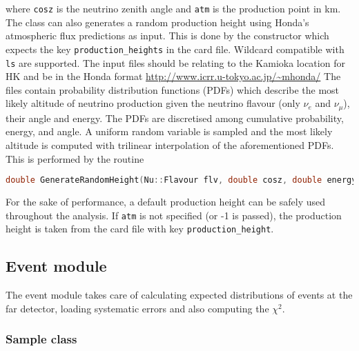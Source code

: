 \documentclass[a4paper, 11pt]{article}
\begin{document}
where \texttt{cosz} is the neutrino zenith angle and \texttt{atm} is the production point in km.
The class can also generates a random production height using Honda's atmospheric flux predictions as input.
This is done by the constructor which expects the key \texttt{production\_heights} in the card file.
Wildcard compatible with \texttt{ls} are supported.
The input files should be relating to the Kamioka location for HK and be in the Honda format \url{http://www.icrr.u-tokyo.ac.jp/~mhonda/}
The files contain probability distribution functions (PDFs) which describe the most likely altitude of neutrino production given %
the neutrino flavour (only $\nu_e$ and $\nu_\mu$), their angle and energy.
The PDFs are discretised among cumulative probability, energy, and angle.
A uniform random variable is sampled and the most likely altitude is computed with trilinear interpolation of the aforementioned PDFs.
This is performed by the routine 
\begin{lstlisting}[language=C++]
    double GenerateRandomHeight(Nu::Flavour flv, double cosz, double energy);
\end{lstlisting}
For the sake of performance, a default production height can be safely used throughout the analysis.
If \texttt{atm} is not specified (or -1 is passed), the production height is taken from the card file %
with key \texttt{production\_height}.


\subsection{Event module}
\label{sec:physics}

The event module takes care of calculating expected distributions of events at the far detector, %
loading systematic errors and also computing the $\chi^2$.

\subsubsection{Sample class}
\label{sec:sample}
\end{document}

